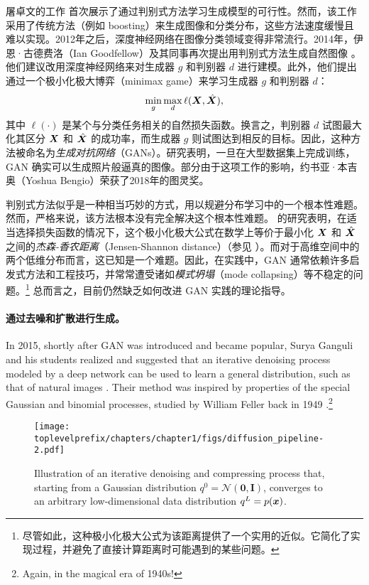 \documentclass[../../book-main.tex]{subfiles}
\begin{document}
屠卓文的工作 \cite{Tu-2007} 首次展示了通过判别式方法学习生成模型的可行性。然而，该工作采用了传统方法（例如 boosting）来生成图像和分类分布，这些方法速度缓慢且难以实现。2012年之后，深度神经网络在图像分类领域变得非常流行。2014年，伊恩·古德费洛（Ian Goodfellow）及其同事再次提出用判别式方法生成自然图像 \cite{Goodfellow-2014}。他们建议改用深度神经网络来对生成器 $g$ 和判别器 $d$ 进行建模。此外，他们提出通过一个极小化极大博弈（minimax game）来学习生成器 $g$ 和判别器 $d$：
\begin{equation}
    \min_g \max_d \ell(\bm{X}, \hat {\bm{X}}),
\end{equation}
其中 $\ell(\cdot)$ 是某个与分类任务相关的自然损失函数。换言之，判别器 $d$ 试图最大化其区分 $\bm{X}$ 和 $\hat {\bm{X}}$ 的成功率，而生成器 $g$ 则试图达到相反的目标。因此，这种方法被命名为{\em 生成对抗网络}（GANs）。研究表明，一旦在大型数据集上完成训练，GAN 确实可以生成照片般逼真的图像。部分由于这项工作的影响，约书亚·本吉奥（Yoshua Bengio）荣获了2018年的图灵奖。

判别式方法似乎是一种相当巧妙的方式，用以规避分布学习中的一个根本性难题。然而，严格来说，该方法根本没有完全解决这个根本性难题。\cite{Goodfellow-2014} 的研究表明，在适当选择损失函数的情况下，这个极小化极大公式在数学上等价于最小化 $\bm{X}$ 和 $\hat {\bm{X}}$ 之间的{\em 杰森-香农距离}（Jensen-Shannon distance）（参见 \cite{Cover-Thomas}）。而对于高维空间中的两个低维分布而言，这已知是一个难题。因此，在实践中，GAN 通常依赖许多启发式方法和工程技巧，并常常遭受诸如{\em 模式坍塌}（mode collapsing）等不稳定的问题。\footnote{尽管如此，这种极小化极大公式为该距离提供了一个实用的近似。它简化了实现过程，并避免了直接计算距离时可能遇到的某些问题。} 总而言之，目前仍然缺乏如何改进 GAN 实践的理论指导。

\paragraph{通过去噪和扩散进行生成。}

In 2015, shortly after GAN was introduced and became popular, Surya Ganguli and his students realized and suggested that an iterative denoising process modeled by a deep network can be used to learn a general distribution, such as that of natural images \cite{Sohl-Dickstein2015}. Their method was inspired by properties of the special Gaussian and binomial processes, studied by William Feller back in 1949 \cite{Feller1949OnTT}.\footnote{Again, in the magical era of 1940s!} 

\begin{figure}[t]
    \centering
    \texttt{[image: \\toplevelprefix/chapters/chapter1/figs/diffusion\_pipeline-2.pdf]}
    \caption{Illustration of an iterative denoising and compressing process that, starting from a Gaussian distribution $q^0 = \mathcal{N}(\boldsymbol{0}, \boldsymbol{I})$, converges to an arbitrary low-dimensional data distribution $q^L = p(\bm{x})$. }
    \label{fig:diffusion}
\end{figure}
\end{document}
